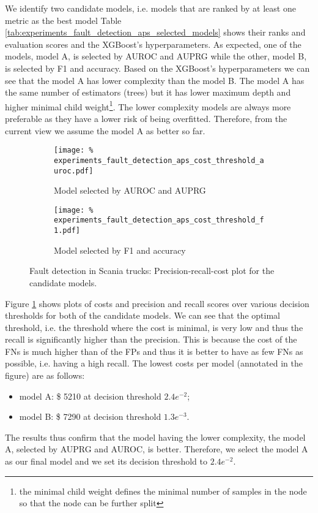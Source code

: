 We identify two candidate models, i.e. models that are ranked by at least one metric as the best model
Table \ref{tab:experiments_fault_detection_aps_selected_models} shows their ranks and evaluation scores and the XGBoost's hyperparameters.
As expected, one of the models, model A, is selected by AUROC and AUPRG while the other, model B, is selected by F1 and accuracy.
Based on the XGBoost's hyperparameters we can see that the model A has lower complexity than the model B.
The model A has the same number of estimators (trees) but it has lower maximum depth and higher minimal child weight\footnote{the minimal child weight defines the minimal number of samples in the node so that the node can be further split}.
The lower complexity models are always more preferable as they have a lower risk of being overfitted.
Therefore, from the current view we assume the model A as better so far.


\begin{figure}
    \centering
    \begin{subfigure}{\textwidth}
        \texttt{[image: \%
        experiments\_fault\_detection\_aps\_cost\_threshold\_auroc.pdf]}
        \caption{Model selected by AUROC and AUPRG}
    \end{subfigure}
    \begin{subfigure}{\textwidth}
        \texttt{[image: \%
        experiments\_fault\_detection\_aps\_cost\_threshold\_f1.pdf]}
        \caption{Model selected by F1 and accuracy}
    \end{subfigure}
    \caption{Fault detection in Scania trucks: Precision-recall-cost plot for the candidate models.}
    \label{fig:experiments_fault_detection_aps_cost_threshold}
\end{figure}

Figure \ref{fig:experiments_fault_detection_aps_cost_threshold} shows plots of costs and precision and recall scores over various decision thresholds for both of the candidate models.
We can see that the optimal threshold, i.e. the threshold where the cost is minimal, is very low and thus the recall is significantly higher than the precision.
This is because the cost of the FNs is much higher than of the FPs and thus it is better to have as few FNs as possible, i.e. having a high recall.
The lowest costs per model (annotated in the figure) are as follows:
\begin{itemize}
    \item model A: \$ 5210 at decision threshold $2.4e^{-2}$;
    \item model B: \$ 7290 at decision threshold $1.3e^{-3}$.
\end{itemize}
The results thus confirm that the model having the lower complexity, the model A, selected by AUPRG and AUROC, is better.
Therefore, we select the model A as our final model and we set its decision threshold to $2.4e^{-2}$.

